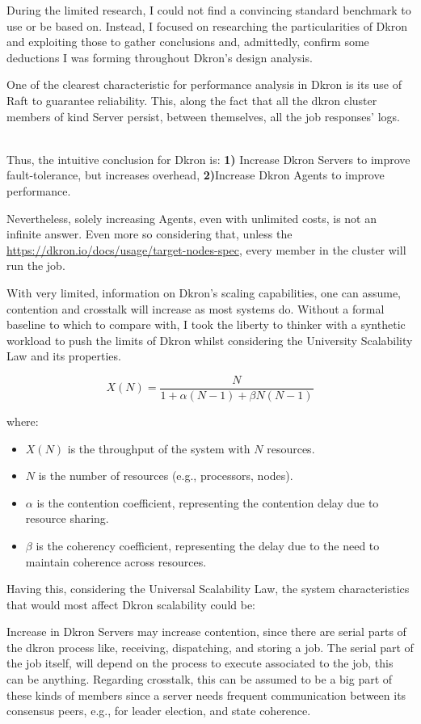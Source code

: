 \documentclass[runningheads]{llncs}
\begin{document}
During the limited research, I could not find a convincing standard benchmark to use or be based on.
Instead, I focused on researching the particularities of Dkron and exploiting those to gather conclusions and,
admittedly, confirm some deductions I was forming throughout Dkron's design analysis.

One of the clearest characteristic for performance analysis in Dkron is its use of Raft to guarantee
reliability. This, along the fact that all the dkron cluster members of kind Server persist,
between themselves, all the job responses' logs.

~\\ Thus, the intuitive conclusion for Dkron is:
\textbf{1)} Increase Dkron Servers to improve fault-tolerance, but increases overhead,
\textbf{2)}Increase Dkron Agents to improve performance.


Nevertheless, solely increasing Agents, even with unlimited costs, is not an infinite answer.
Even more so considering that, unless the
\href{job is targeted to a set of tags}{https://dkron.io/docs/usage/target-nodes-spec},
every member in the cluster will run the job.

With very limited, information on Dkron's scaling capabilities, one can assume, contention and crosstalk will increase as most systems do.
Without a formal baseline to which to compare with, I took the liberty to thinker with a synthetic workload
to push the limits of Dkron whilst considering the University Scalability Law and its properties.

\[
X(N) = \frac{N}{1 + \alpha (N - 1) + \beta N (N - 1)}
\]

where:
\begin{itemize}
    \item \( X(N) \) is the throughput of the system with \( N \) resources.
    \item \( N \) is the number of resources (e.g., processors, nodes).
    \item \( \alpha \) is the contention coefficient, representing the contention delay due to resource sharing.
    \item \( \beta \) is the coherency coefficient, representing the delay due to the need to maintain coherence across resources.
\end{itemize}

Having this, considering the Universal Scalability Law, the system characteristics that would most
affect Dkron scalability could be:

Increase in Dkron Servers may increase contention, since there are serial parts of the dkron process like,
receiving, dispatching, and storing a job. The serial part of the job itself, will
depend on the process to execute associated to the job, this can be anything. Regarding
crosstalk, this can be assumed to be a big part of these kinds of members since
a server needs frequent communication between its consensus peers, e.g., for
leader election, and state coherence.
\end{document}
